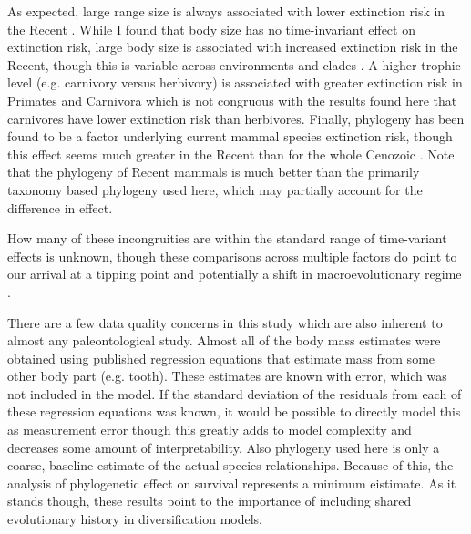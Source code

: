 \documentclass{nature}
\begin{document}
As expected, large range size is always associated with lower extinction risk in the Recent \cite{Fritz2009,Fritz2010b,Liow2009,Purvis2000a}. While I found that body size has no time-invariant effect on extinction risk, large body size is associated with increased extinction risk in the Recent, though this is variable across environments and clades \cite{Liow2009,Fritz2009,Purvis2000a}. A higher trophic level (e.g. carnivory versus herbivory) is associated with greater extinction risk in Primates and Carnivora \cite{Purvis2000a} which is not congruous with the results found here that carnivores have lower extinction risk than herbivores. Finally, phylogeny has been found to be a factor underlying current mammal species extinction risk, though this effect seems much greater in the Recent than for the whole Cenozoic \cite{Fritz2010b}. Note that the phylogeny of Recent mammals is much better than the primarily taxonomy based phylogeny used here, which may partially account for the difference in effect.

How many of these incongruities are within the standard range of time-variant effects is unknown, though these comparisons across multiple factors do point to our arrival at a tipping point \cite{Barnosky2012a,Barnosky2011} and potentially a shift in macroevolutionary regime \cite{Jablonski1986}.


There are a few data quality concerns in this study which are also inherent to almost any paleontological study. Almost all of the body mass estimates were obtained using published regression equations that estimate mass from some other body part (e.g. tooth). These estimates are known with error, which was not included in the model. If the standard deviation of the residuals from each of these regression equations was known, it would be possible to directly model this as measurement error \cite{Gelman2013d} though this greatly adds to model complexity and decreases some amount of interpretability.  Also phylogeny used here is only a coarse, baseline estimate of the actual species relationships. Because of this, the analysis of phylogenetic effect on survival represents a minimum eistimate. As it stands though, these results point to the importance of including shared evolutionary history in diversification models.
\end{document}
